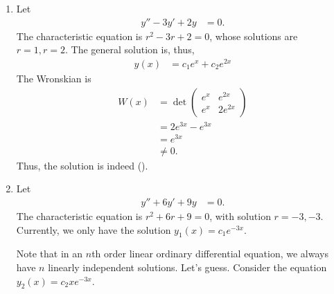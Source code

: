 \documentclass[10pt]{mypackage}
\begin{document}
\begin{example}\hfill
  \begin{enumerate}[(1)]
    \item Let
      \begin{align*}
        y'' - 3y' + 2y &= 0.
      \end{align*}
      The characteristic equation is $r^2 - 3r + 2 = 0$, whose solutions are $r=1,r=2$. The general solution is, thus,
      \begin{align*}
        y(x) &= c_1 e^x + c_2e^{2x}\tag{\textdagger}
      \end{align*}
      The Wronskian is
      \begin{align*}
        W(x) &= \det \begin{pmatrix}e^x & e^{2x} \\ e^x & 2e^{2x}\end{pmatrix}\\
             &= 2e^{3x} - e^{3x}\\
             &= e^{3x}\\
             &\neq 0.
      \end{align*}
      Thus, the solution is indeed (\textdagger).
    \item Let
      \begin{align*}
        y'' + 6y' + 9y &=0.
      \end{align*}
      The characteristic equation is $r^2 + 6r + 9 =0$, with solution $r = -3,-3$. Currently, we only have the solution $y_1(x) = c_1e^{-3x}$.\newline

      Note that in an $n$th order linear ordinary differential equation, we always have $n$ linearly independent solutions. Let's guess. Consider the equation $y_2(x) = c_2xe^{-3x}$.\newline


\end{enumerate}
\end{example}
\end{document}
